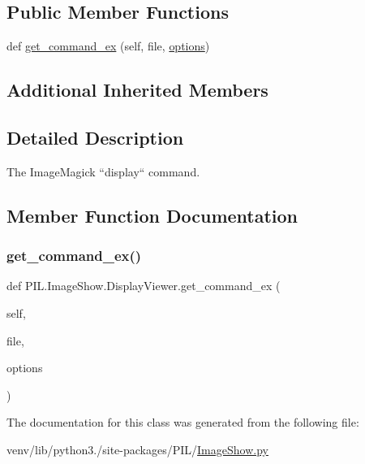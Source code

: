 \subsection*{Public Member Functions}
\begin{DoxyCompactItemize}
\item 
def \hyperlink{classPIL_1_1ImageShow_1_1DisplayViewer_afd4f674815e73da0d307b2ec2ee8a03b}{get\+\_\+command\+\_\+ex} (self, file, \hyperlink{classPIL_1_1ImageShow_1_1UnixViewer_afbac95ff1c2d0ab0858163dd7e80671e}{options})
\end{DoxyCompactItemize}
\subsection*{Additional Inherited Members}


\subsection{Detailed Description}
\begin{DoxyVerb}The ImageMagick ``display`` command.\end{DoxyVerb}
 

\subsection{Member Function Documentation}
\mbox{\label{classPIL_1_1ImageShow_1_1DisplayViewer_afd4f674815e73da0d307b2ec2ee8a03b}} 
\subsubsection{\texorpdfstring{get\+\_\+command\+\_\+ex()}{get\_command\_ex()}}
{\footnotesize\ttfamily def P\+I\+L.\+Image\+Show.\+Display\+Viewer.\+get\+\_\+command\+\_\+ex (\begin{DoxyParamCaption}\item[{}]{self,  }\item[{}]{file,  }\item[{}]{options }\end{DoxyParamCaption})}



The documentation for this class was generated from the following file\+:\begin{DoxyCompactItemize}
\item 
venv/lib/python3./site-\/packages/\+P\+I\+L/\hyperlink{ImageShow_8py}{Image\+Show.\+py}\end{DoxyCompactItemize}
